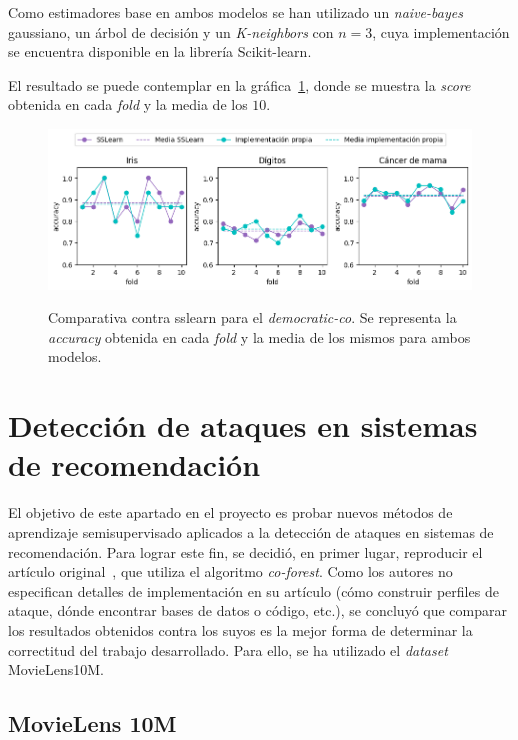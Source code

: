 Como estimadores base en ambos modelos se han utilizado un \textit{naive-bayes} gaussiano, un árbol de decisión y un \textit{K-neighbors} con $n = 3$, cuya implementación se encuentra disponible en la librería Scikit-learn.


El resultado se puede contemplar en la gráfica~\ref{gr:dc_vs_sslearn}, donde se muestra la \textit{score} obtenida en cada \textit{fold} y la media de los $10$.

\begin{figure}[h]
	\caption[\textit{Democratic-co}: comparativa contra \textit{sslearn}]{Comparativa contra sslearn para el \textit{democratic-co}. Se representa la \textit{accuracy} obtenida en cada \textit{fold} y la media de los mismos para ambos modelos.}
	\centering
	\includegraphics[scale=0.62]{../img/memoria/5_tritraining_sslearn}
	\label{gr:dc_vs_sslearn}
\end{figure}


\section{Detección de ataques en sistemas de recomendación}

El objetivo de este apartado en el proyecto es probar nuevos métodos de aprendizaje semisupervisado aplicados a la detección de ataques en sistemas de recomendación. Para lograr este fin, se decidió, en primer lugar, reproducir el artículo original~\cite{zhou2021SemisupervisedRecommendationAttack}, que utiliza el algoritmo \textit{co-forest}. Como los autores no especifican detalles de implementación en su artículo (cómo construir perfiles de ataque, dónde encontrar bases de datos o código, etc.), se concluyó que comparar los resultados obtenidos contra los suyos es la mejor forma de determinar la correctitud del trabajo desarrollado. Para ello, se ha utilizado el \textit{dataset} MovieLens10M.

\subsection{MovieLens 10M}
